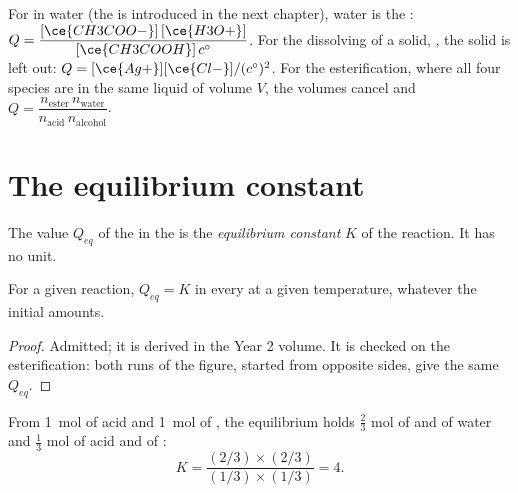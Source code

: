 \begin{example}\label{ex:g12:equilibrium:quotients}
For  in water (the   is
introduced in the next chapter), water is the :
$Q = \dfrac{[\ce{CH3COO-}]\,[\ce{H3O+}]}{[\ce{CH3COOH}]\,c^\circ}$. For the
dissolving of a solid, , the solid is left out:
$Q = [\ce{Ag+}][\ce{Cl-}]/(c^\circ)^2$. For the esterification, where all
four species are in the same liquid  of volume $V$, the volumes
cancel and $Q = \dfrac{n_{\text{ester}}\, n_{\text{water}}}{n_{\text{acid}}\, n_{\text{alcohol}}}$.
\end{example}

\section{The equilibrium constant}

\begin{definition}\label{def:g12:equilibrium:constant}
The value $Q_{eq}$ of the  in the  is
the \emph{equilibrium constant} $K$ of the
reaction. It has no unit.
\end{definition}

\begin{proposition}\label{prop:g12:equilibrium:constant}
For a given reaction, $Q_{eq} = K$ in every  at a given
temperature, whatever the initial amounts.
\end{proposition}

\begin{proof}
Admitted; it is derived in the Year 2 volume. It is checked on the
esterification: both runs of the figure, started from opposite sides,
give the same $Q_{eq}$.
\end{proof}

\begin{example}\label{ex:g12:equilibrium:k-ester}
From \qty{1}{mol} of acid and \qty{1}{mol} of , the equilibrium
holds $\frac{2}{3}$ mol of  and of water and $\frac{1}{3}$ mol of
acid and of :
\[
  K = \frac{(2/3)\times(2/3)}{(1/3)\times(1/3)} = 4 .
\]
\end{example}

